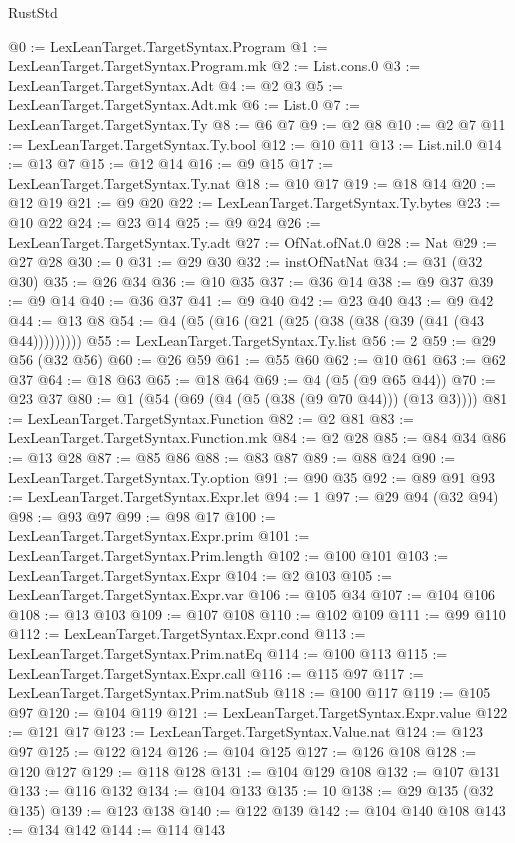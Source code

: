 \begin{lexlean}{RustStd}
\begin{coremodule}
@0 := LexLeanTarget.TargetSyntax.Program
@1 := LexLeanTarget.TargetSyntax.Program.mk
@2 := List.cons.{0}
@3 := LexLeanTarget.TargetSyntax.Adt
@4 := @2 @3
@5 := LexLeanTarget.TargetSyntax.Adt.mk
@6 := List.{0}
@7 := LexLeanTarget.TargetSyntax.Ty
@8 := @6 @7
@9 := @2 @8
@10 := @2 @7
@11 := LexLeanTarget.TargetSyntax.Ty.bool
@12 := @10 @11
@13 := List.nil.{0}
@14 := @13 @7
@15 := @12 @14
@16 := @9 @15
@17 := LexLeanTarget.TargetSyntax.Ty.nat
@18 := @10 @17
@19 := @18 @14
@20 := @12 @19
@21 := @9 @20
@22 := LexLeanTarget.TargetSyntax.Ty.bytes
@23 := @10 @22
@24 := @23 @14
@25 := @9 @24
@26 := LexLeanTarget.TargetSyntax.Ty.adt
@27 := OfNat.ofNat.{0}
@28 := Nat
@29 := @27 @28
@30 := 0
@31 := @29 @30
@32 := instOfNatNat
@34 := @31 (@32 @30)
@35 := @26 @34
@36 := @10 @35
@37 := @36 @14
@38 := @9 @37
@39 := @9 @14
@40 := @36 @37
@41 := @9 @40
@42 := @23 @40
@43 := @9 @42
@44 := @13 @8
@54 := @4 (@5 (@16 (@21 (@25 (@38 (@38 (@39 (@41 (@43 @44)))))))))
@55 := LexLeanTarget.TargetSyntax.Ty.list
@56 := 2
@59 := @29 @56 (@32 @56)
@60 := @26 @59
@61 := @55 @60
@62 := @10 @61
@63 := @62 @37
@64 := @18 @63
@65 := @18 @64
@69 := @4 (@5 (@9 @65 @44))
@70 := @23 @37
@80 := @1 (@54 (@69 (@4 (@5 (@38 (@9 @70 @44))) (@13 @3))))
@81 := LexLeanTarget.TargetSyntax.Function
@82 := @2 @81
@83 := LexLeanTarget.TargetSyntax.Function.mk
@84 := @2 @28
@85 := @84 @34
@86 := @13 @28
@87 := @85 @86
@88 := @83 @87
@89 := @88 @24
@90 := LexLeanTarget.TargetSyntax.Ty.option
@91 := @90 @35
@92 := @89 @91
@93 := LexLeanTarget.TargetSyntax.Expr.let
@94 := 1
@97 := @29 @94 (@32 @94)
@98 := @93 @97
@99 := @98 @17
@100 := LexLeanTarget.TargetSyntax.Expr.prim
@101 := LexLeanTarget.TargetSyntax.Prim.length
@102 := @100 @101
@103 := LexLeanTarget.TargetSyntax.Expr
@104 := @2 @103
@105 := LexLeanTarget.TargetSyntax.Expr.var
@106 := @105 @34
@107 := @104 @106
@108 := @13 @103
@109 := @107 @108
@110 := @102 @109
@111 := @99 @110
@112 := LexLeanTarget.TargetSyntax.Expr.cond
@113 := LexLeanTarget.TargetSyntax.Prim.natEq
@114 := @100 @113
@115 := LexLeanTarget.TargetSyntax.Expr.call
@116 := @115 @97
@117 := LexLeanTarget.TargetSyntax.Prim.natSub
@118 := @100 @117
@119 := @105 @97
@120 := @104 @119
@121 := LexLeanTarget.TargetSyntax.Expr.value
@122 := @121 @17
@123 := LexLeanTarget.TargetSyntax.Value.nat
@124 := @123 @97
@125 := @122 @124
@126 := @104 @125
@127 := @126 @108
@128 := @120 @127
@129 := @118 @128
@131 := @104 @129 @108
@132 := @107 @131
@133 := @116 @132
@134 := @104 @133
@135 := 10
@138 := @29 @135 (@32 @135)
@139 := @123 @138
@140 := @122 @139
@142 := @104 @140 @108
@143 := @134 @142
@144 := @114 @143

\end{coremodule}
\end{lexlean}
